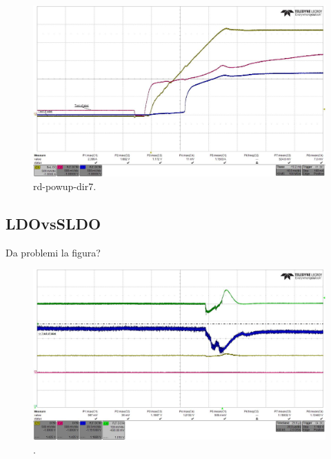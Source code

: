 \begin{figure}
\centering
\includegraphics[scale=.3]{Immagini/rd-powup-dir7}
\caption{rd-powup-dir7.}
\label{rd-powup-dir7}
\end{figure}


\subsection{LDOvsSLDO}
Da problemi la figura?
\begin{figure}
\centering
\includegraphics[scale=.3]{Immagini/alllin1}
\caption{.}
\label{alllin1}
\end{figure}


